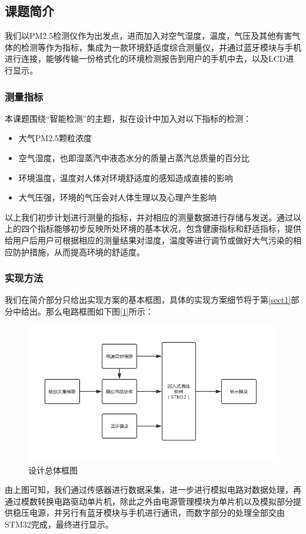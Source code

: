 \documentclass[a4paper, 11pt]{article} %
\begin{document}
\subsection{课题简介}
\par{} 我们以PM2.5检测仪作为出发点，进而加入对空气湿度，温度，气压及其他有害气体的检测等作为指标，集成为一款环境舒适度综合测量仪，并通过蓝牙模块与手机进行连接，能够传输一份格式化的环境检测报告到用户的手机中去，以及LCD进行显示。
\subsubsection{测量指标}
\par{} 本课题围绕“智能检测”的主题，拟在设计中加入对以下指标的检测：
\begin{itemize}
    \item 大气PM2.5颗粒浓度
    \item 空气湿度，也即湿蒸汽中液态水分的质量占蒸汽总质量的百分比
    \item 环境温度，温度对人体对环境舒适度的感知造成直接的影响
    \item 大气压强，环境的气压会对人体生理以及心理产生影响
\end{itemize}
\par{} 以上我们初步计划进行测量的指标，并对相应的测量数据进行存储与发送。通过以上的四个指标能够初步反映所处环境的基本状况，包含健康指标和舒适指标，提供给用户后用户可根据相应的测量结果对湿度，温度等进行调节或做好大气污染的相应防护措施，从而提高环境的舒适度。


\subsubsection{实现方法}
\par{} 我们在简介部分只给出实现方案的基本框图，具体的实现方案细节将于第\ref{sect1}部分中给出。那么电路框图如下图[\ref{img1}]所示：
\begin{figure}[H]
    \centering
    \includegraphics[scale = 0.58 ]{1-1.png}
    \caption{设计总体框图}
    \label{img1} 
  \end{figure}
\par{} 由上图可知，我们通过传感器进行数据采集，进一步进行模拟电路对数据处理，再通过模数转换电路驱动单片机，除此之外由电源管理模块为单片机以及模拟部分提供稳压电源，并另行有蓝牙模块与手机进行通讯，而数字部分的处理全部交由STM32完成，最终进行显示。
\end{document}
